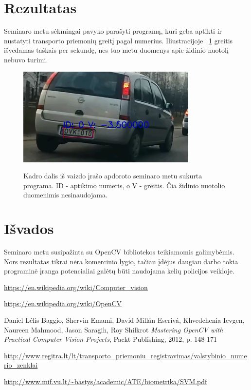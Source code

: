 \documentclass[a4paper,12pt]{article}
\begin{document}
\section*{Rezultatas}
Seminaro metu sėkmingai pavyko parašyti programą, kuri geba aptikti ir nustatyti transporto priemonių greitį pagal numerius. Iliustracijoje ~\ref{fig:Kadras} greitis išvedamas taškais per sekundę, nes tuo metu duomenys apie židinio nuotolį nebuvo turimi.
\begin{figure}[h!]
  \caption{Kadro dalis iš vaizdo įrašo apdoroto seminaro metu sukurta programa. ID - aptikimo numeris, o V - greitis. Čia židinio nuotolio duomenimis nesinaudojama.}
  \centering
    \includegraphics[width=0.8\textwidth]{kadras.png}
  \label{fig:Kadras}
\end{figure}

\section*{Išvados}
Seminaro metu susipažinta su OpenCV bibliotekos teikiamomis galimybėmis. Nors rezultatas tikrai nėra komercinio lygio, tačiau įdėjus daugiau darbo tokia programinė įranga potencialiai galėtų būti naudojama kelių policijos veikloje.
 
\newpage
 
\begin{thebibliography}{99}
\url{https://en.wikipedia.org/wiki/Computer_vision} 

\url{https://en.wikipedia.org/wiki/OpenCV} 

 
Daniel Lélis Baggio, Shervin Emami, David Millán Escrivá, Khvedchenia Ievgen, Naureen Mahmood, Jason Saragih, Roy Shilkrot \textit{Mastering OpenCV with Practical Computer Vision Projects}, Packt Publishing, 2012, p. 148-171

\url{http://www.regitra.lt/lt/transporto_priemoniu_registravimas/valstybinio_numerio_zenklai}

\url{http://www.mif.vu.lt/~bastys/academic/ATE/biometrika/SVM.pdf}

\end{thebibliography} 
 
\end{document}

